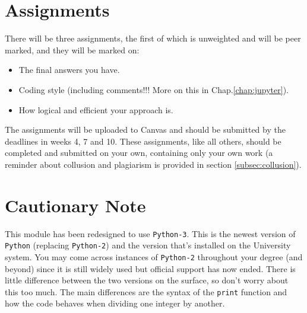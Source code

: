 
\section*{Assignments}
There will be three assignments, the first of which is unweighted and will be peer marked, and they will be marked on:

\begin{itemize}
    \item The final answers you have.
    \item Coding style (including comments!!! More on this in Chap.\ref{chap:jupyter}).
    \item How logical and efficient your approach is.
\end{itemize}

\noindent The assignments will be uploaded to Canvas and should be submitted by the deadlines in weeks 4, 7 and 10. These assignments, like all others, should be completed and submitted on your own, containing only your own work (a reminder about collusion and plagiarism is provided in section \ref{subsec:collusion}). %

\section*{Cautionary Note}

This module has been redesigned to use \texttt{Python-3}. This is the newest version of  \texttt{Python} (replacing \texttt{Python-2}) and the version that's installed on the University system. You may come across instances of \texttt{Python-2} throughout your degree (and beyond) since it is still widely used but official support has now ended. There is little difference between the two versions on the surface, so don't worry about this too much. The main differences are the syntax of the \texttt{print} function and how the code behaves when dividing one integer by another.

